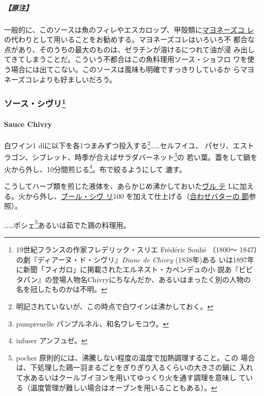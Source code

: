 \begin{recette}
\hypertarget{ux539fux6ce8-4}{%
\subparagraph{【原注】}\label{ux539fux6ce8-4}}

一般的に、このソースは魚のフィレやエスカロップ、甲殻類に\protect\hyperlink{}{マヨネーズコ
レ}の代わりとして用いることをお勧めする。マヨネーズコレはいろいろ不
都合な点があり、そのうちの最大のものは、ゼラチンが溶けるにつれて油が浸
み出してきてしまうことだ。こういう不都合はこの魚料理用ソース・ショフロ
ワを使う場合には出てこない。このソースは風味も明確ですっきりしているか
らマヨネーズコレよりも好ましいだろう。

\maeaki

\hypertarget{ux30bdux30fcux30b9ux30b7ux30f4ux30ea33}{%
\subsubsection[ソース・シヴリ]{\texorpdfstring{ソース・シヴリ\footnote{19世紀フランスの作家フレデリック・スリエ
  Frédéric Soulié （1800〜
  1847）の劇『ディアーヌ・ド・シヴリ』\emph{Diane de Chivry}
  (1838年)ある
  いは1897年に新聞「フィガロ」に掲載されたエルネスト・カペンデュの小
  説あ『ビビタパン』の登場人物名Chivryにちなんだか、あるいはまったく別の人物の
  名を冠したものかは不明。}}{ソース・シヴリ}}\label{ux30bdux30fcux30b9ux30b7ux30f4ux30ea33}}

\hypertarget{sacue-chivry}{%
\paragraph{Sauce Chivry}\label{sacue-chivry}}

白ワイン1\undemi{} dlに以下を各1つまみずつ投入する\footnote{明記されていないが、この時点で白ワインは沸かしておく。}\ldots{}\ldots{}セルフイユ、
パセリ、エストラゴン、シブレット、時季が合えばサラダバーネット\footnote{pumprenelle
  パンプルネル、和名ワレモコウ。}の
若い葉。蓋をして鍋を火から外し、10分間煎じる\footnote{infuser
  アンフュゼ。}。布で絞るようにして 漉す。

こうしてハーブ類を煎じた液体を、あらかじめ沸かしておいた\protect\hyperlink{veloute}{ヴル
テ}\troisquarts{}
Lに加える。火から外し、\protect\hyperlink{beurre-a-la-chivry}{ブール・シヴ
リ}100
を加えて仕上げる（\protect\hyperlink{beurres-composes}{合わせバターの
節}参照）。

\ldots{}\ldots{}ポシェ\footnote{pocher
  原則的には、沸騰しない程度の温度で加熱調理すること。この
  場合は、下処理した鶏一羽まるごとをぎりぎり入るくらいの大きさの鍋に
  入れて水あるいはクールブイヨンを用いてゆっくり火を通す調理を意味し
  ている（温度管理が難しい場合はオーブンを用いることもある）。}あるいは茹でた鶏の料理用。


\end{recette}
